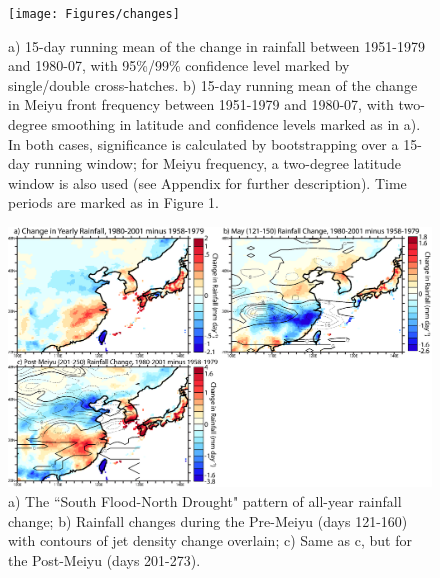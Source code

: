 \documentclass[draft,grl]{AGUTeX}
\begin{document}
\begin{figure}[htbp]
\begin{center}
\texttt{[image: Figures/changes]}
\caption{a) 15-day running mean of the change in rainfall between 1951-1979 and 1980-07, with 95\%/99\% confidence level marked by single/double cross-hatches. b) 15-day running mean of the change in Meiyu front frequency between 1951-1979 and 1980-07, with two-degree smoothing in latitude and confidence levels marked as in a). In both cases, significance is calculated by bootstrapping over a 15-day running window; for Meiyu frequency, a two-degree latitude window is also used (see Appendix for further description). Time periods are marked as in Figure 1.}
\label{changes}
\end{center}
\end{figure}

\begin{figure}
\noindent\includegraphics[width=36pc]{Figures/changes_2d}
\caption{a) The ``South Flood-North Drought" pattern of all-year rainfall change; b) Rainfall changes during the Pre-Meiyu (days 121-160) with contours of jet density change overlain; c) Same as c, but for the Post-Meiyu (days 201-273).}
\label{changes_2d}
\end{figure}
\end{document}
